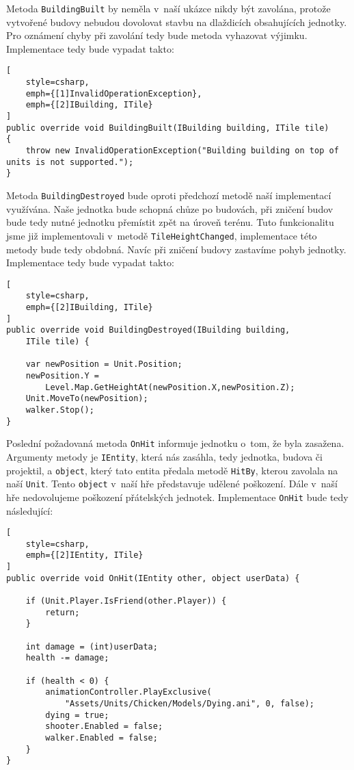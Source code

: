 Metoda \texttt{BuildingBuilt} by neměla v~naší ukázce nikdy být zavolána, protože vytvořené budovy nebudou dovolovat stavbu na dlaždicích obsahujících jednotky. Pro oznámení chyby při zavolání tedy bude metoda vyhazovat výjimku. Implementace tedy bude vypadat takto:

\begin{lstlisting}[
	style=csharp,
	emph={[1]InvalidOperationException},
	emph={[2]IBuilding, ITile}
]
public override void BuildingBuilt(IBuilding building, ITile tile)
{
	throw new InvalidOperationException("Building building on top of units is not supported.");
}
\end{lstlisting}

Metoda \texttt{BuildingDestroyed} bude oproti předchozí metodě naší implementací využívána. Naše jednotka bude schopná chůze po budovách, při zničení budov bude tedy nutné jednotku přemístit zpět na úroveň terénu. Tuto funkcionalitu jsme již implementovali v~metodě \texttt{TileHeightChanged}, implementace této metody bude tedy obdobná. Navíc při zničení budovy zastavíme pohyb jednotky. Implementace tedy bude vypadat takto:

\begin{lstlisting}[
	style=csharp,
	emph={[2]IBuilding, ITile}
]
public override void BuildingDestroyed(IBuilding building, 
	ITile tile) {
	
	var newPosition = Unit.Position;
	newPosition.Y = 
		Level.Map.GetHeightAt(newPosition.X,newPosition.Z);
	Unit.MoveTo(newPosition);
	walker.Stop();
}
\end{lstlisting}

Poslední požadovaná metoda \texttt{OnHit} informuje jednotku o~tom, že byla zasažena. Argumenty metody je \texttt{IEntity}, která nás zasáhla, tedy jednotka, budova či projektil, a \texttt{object}, který tato entita předala metodě \texttt{HitBy}, kterou zavolala na naší \texttt{Unit}. Tento \texttt{object} v~naší hře představuje udělené poškození. Dále v~naší hře nedovolujeme poškození přátelských jednotek. Implementace \texttt{OnHit} bude tedy následující:

\begin{lstlisting}[
	style=csharp,
	emph={[2]IEntity, ITile}
]
public override void OnHit(IEntity other, object userData) {
	
	if (Unit.Player.IsFriend(other.Player)) {
		return;
	}

	int damage = (int)userData;
	health -= damage;

	if (health < 0) {
		animationController.PlayExclusive(
			"Assets/Units/Chicken/Models/Dying.ani", 0, false);
		dying = true;
		shooter.Enabled = false;
		walker.Enabled = false;
	}
}
\end{lstlisting}

